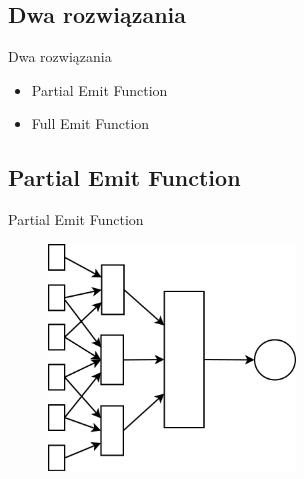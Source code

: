 \documentclass{beamer}
\begin{document}
\subsection*{Dwa rozwiązania}

\begin{frame}{Dwa rozwiązania}
\begin{itemize}
	\item Partial Emit Function
	\item Full Emit Function
\end{itemize}
\end{frame}


\subsection*{Partial Emit Function}

\begin{frame}{Partial Emit Function}
\begin{figure}[H]
	\begin{center}
  		\includegraphics[height=6cm]{PresentationPartial.png}
	\end{center}
\end{figure}
\end{frame}
\end{document}
